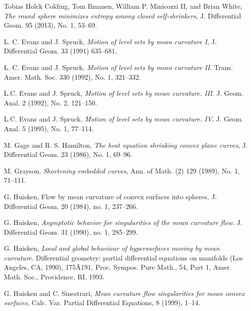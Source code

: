 \documentclass{amsart}
\theoremstyle{definition}
\begin{document}
\begin{thebibliography}{A}
Tobias Holck Colding, Tom Ilmanen, William P. Minicozzi II, and Brian White, 
{\emph{The round sphere minimizes entropy among closed self-shrinkers}}, J. Differential Geom. 95 (2013), No. 1, 53--69. 
 
L. C. Evans and J. Spruck, \emph{Motion of level sets by mean curvature I}, J. Differential Geom.  33 (1991) 635--681.

L. C. Evans and J. Spruck, 
\emph{Motion of level sets by mean curvature II}. Trans. Amer. Math. Soc. 330 (1992), No. 1, 321--332. 

L.C. Evans and J. Spruck, 
\emph{Motion of level sets by mean curvature. III}. 
J. Geom. Anal. 2 (1992), No. 2, 121--150. 

L.C. Evans and J. Spruck, 
\emph{Motion of level sets by mean curvature. IV}. J. Geom. Anal. 5 (1995), No. 1, 77--114. 

M. Gage and R. S. Hamilton, \emph{The heat equation shrinking convex plane curves}, J. Differential Geom. 
23 (1986), No. 1, 69--96.

M. Grayson,  \emph{Shortening embedded curves},  Ann. of Math. (2) 129 (1989), No. 1, 71--111. 

G. Huisken, Flow by mean curvature of convex surfaces into spheres, J. Differential Geom. 20 (1984), no. 1, 237--266.  

G. Huisken, \emph{Asymptotic behavior for singularities of the mean curvature flow}. J. Differential
Geom. 31 (1990), no. 1, 285--299.

G. Huisken, \emph{Local and global behaviour of hypersurfaces moving by mean curvature}. Differential geometry:
partial differential equations on manifolds (Los Angeles, CA, 1990), 175Ã191, Proc. Sympos. Pure Math.,
54, Part 1, Amer. Math. Soc., Providence, RI, 1993.

G. Huisken and C. Sinestrari, 
\emph{Mean curvature flow singularities for mean convex surfaces}, 
Calc. Var. Partial Differential Equations, 8 (1999), 1--14.


\end{thebibliography}
\end{document}
